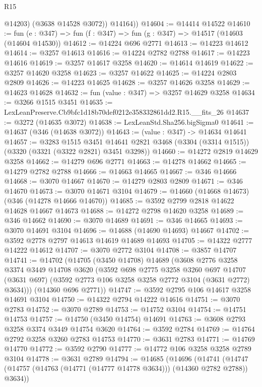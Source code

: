 \begin{lexlean}{R15}
\begin{coremodule}
            @14203)
          (@3638 @14528 @3072))
        @14164))
@14604 := @14414 @14522
@14610 := fun (e : @347) => fun (f : @347) => fun (g : @347) => @14517 (@14603 (@14604 @14530))
@14612 := @14224 @696 @2771
@14613 := @14223 @14612
@14614 := @3257 @14613
@14616 := @14224 @2782 @2788
@14617 := @14223 @14616
@14619 := @3257 @14617 @3258
@14620 := @14614 @14619
@14622 := @3257 @14620 @3258
@14623 := @3257 @14622
@14625 := @14224 @2803 @2809
@14626 := @14223 @14625
@14628 := @3257 @14626 @3258
@14629 := @14623 @14628
@14632 := fun (value : @347) => @3257 @14629 @3258
@14634 := @3266 @1515 @3451
@14635 := LexLeanPreserve.Cb9bfc1d18b70def0212e358332861dd2.R15.__fits_26
@14637 := @3272 (@14635 @3072)
@14638 := LexLeanStd.Sha256.bigSigma0
@14641 := @14637 (@346 (@14638 @3072))
@14643 := (value : @347) -> @14634 @14641
@14657 := @3283
    @1515
    @3451
    @14641
    @2821
    @3468
    (@3304 (@3314 @1515))
    (@3320 (@3321 (@3322 @2821) @3451 @3298))
@14660 := @14272 @2819 @14629 @3258
@14662 := @14279 @696 @2771
@14663 := @14278 @14662
@14665 := @14279 @2782 @2788
@14666 := @14663 @14665
@14667 := @346 @14666
@14668 := @3070 @14667
@14670 := @14279 @2803 @2809
@14671 := @346 @14670
@14673 := @3070 @14671 @3104
@14679 := @14660 (@14668 @14673) (@346 (@14278 @14666 @14670))
@14685 := @3592 @2799 @2818 @14622 @14628 @14667 @14673
@14688 := @14272 @2798 @14620 @3258
@14689 := @346 @14662
@14690 := @3070 @14689
@14691 := @346 @14665
@14693 := @3070 @14691 @3104
@14696 := @14688 (@14690 @14693) @14667
@14702 := @3592 @2778 @2797 @14613 @14619 @14689 @14693
@14705 := @14322 @2777 @14222 @14612
@14707 := @3070 @2772 @3104
@14708 := @3857 @14707
@14741 := @14702
    (@14705
      (@3450 @14708)
      @14689
      (@3608
        @2776
        @3258
        @3374
        @3449
        @14708
        @3620
        (@3592
          @698
          @2775
          @3258
          @3260
          @697
          @14707
          (@3631 @697)
          (@3592 @2773 @106 @3258 @3258 @2772 @3104 (@3631 @2772) @3634)))
      (@14360 @696 @2771))
@14747 := @3592 @2795 @106 @14617 @3258 @14691 @3104
@14750 := @14322 @2794 @14222 @14616
@14751 := @3070 @2783
@14752 := @3070 @2789
@14753 := @14752 @3104
@14754 := @14751 @14753
@14757 := @14750 (@3450 @14754) @14691
@14763 := @3608 @2793 @3258 @3374 @3449 @14754 @3620
@14764 := @3592 @2784
@14769 := @14764 @2792 @3258 @3260 @2783 @14753
@14770 := @3631 @2783
@14771 := @14769 @14770
@14772 := @3592 @2790
@14777 := @14772 @106 @3258 @3258 @2789 @3104
@14778 := @3631 @2789
@14794 := @14685
    (@14696
      (@14741 (@14747 (@14757 (@14763 (@14771 (@14777 @14778 @3634))) (@14360 @2782 @2788)) @3634))

\end{coremodule}
\end{lexlean}
